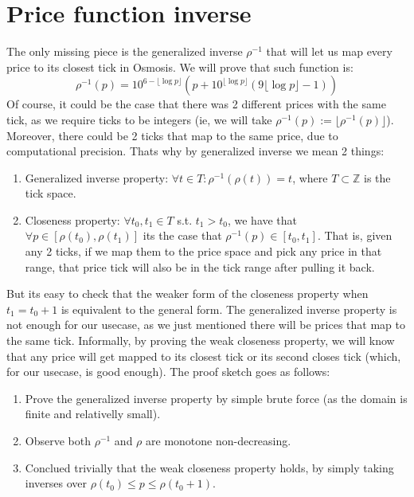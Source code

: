 \documentclass[11pt]{article}
\begin{document}
\section{Price function inverse}
The only missing piece is the generalized inverse $\rho^{-1}$ that will let
us map every price to its closest tick in Osmosis. We will prove that such
function is:
\[
\rho^{-1}(p) = 10^{6-\lfloor\log p\rfloor} \left(
	p+10^{\lfloor\log p\rfloor}\left(
		9\lfloor\log p\rfloor-1
	\right)
\right)
\]
Of course, it could be the case that there was 2 different prices with the same
tick, as we require ticks to be integers (ie, we will take $\rho^{-1}(p) :=
\lfloor \rho^{-1}(p)\rfloor$). Moreover, there could be 2 ticks that map to the
same price, due to computational precision. Thats why by generalized inverse we
mean 2 things:
\begin{enumerate}
    \item Generalized inverse property: $\forall t\in T: \rho^{-1}(\rho(t)) =
        t$, where $T\subset\mathbb Z$ is the tick space.
    \item Closeness property: $\forall t_0, t_1\in T$ s.t. $t_1 > t_0$, we have
        that $\forall p\in [\rho(t_0), \rho(t_1)]$ its the case that
        $\rho^{-1}(p)\in[t_0, t_1]$. That is, given any 2 ticks, if we map them
        to the price space and pick any price in that range, that price tick will
        also be in the tick range after pulling it back.
\end{enumerate}
But its easy to check that the weaker form of the closeness property when $t_1
= t_0 + 1$ is equivalent to the general form. The generalized inverse property
is not enough for our usecase, as we just mentioned there will be prices that
map to the same tick. Informally, by proving the weak closeness
property, we will know that any price will get mapped to its closest tick or
its second closes tick (which, for our usecase, is good enough). The proof
sketch goes as follows:
\begin{enumerate}
    \item Prove the generalized inverse property by simple brute force (as the
        domain is finite and relativelly small).
    \item Observe both $\rho^{-1}$ and $\rho$ are monotone non-decreasing.
    \item Conclued trivially that the weak closeness property holds, by simply
        taking inverses over $\rho(t_0) \leq p \leq \rho(t_0 + 1)$.
\end{enumerate}
\end{document}
